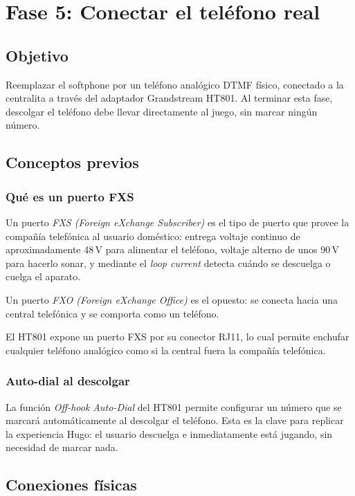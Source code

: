 \chapter{Fase 5: Conectar el teléfono real}

\section{Objetivo}

Reemplazar el softphone por un teléfono analógico DTMF físico, conectado a la centralita a través del adaptador Grandstream HT801. Al terminar esta fase, descolgar el teléfono debe llevar directamente al juego, sin marcar ningún número.

\section{Conceptos previos}

\subsection{Qué es un puerto FXS}

Un puerto \emph{FXS (Foreign eXchange Subscriber)} es el tipo de puerto que provee la compañía telefónica al usuario doméstico: entrega voltaje continuo de aproximadamente 48\,V para alimentar el teléfono, voltaje alterno de unos 90\,V para hacerlo sonar, y mediante el \emph{loop current} detecta cuándo se descuelga o cuelga el aparato.

Un puerto \emph{FXO (Foreign eXchange Office)} es el opuesto: se conecta hacia una central telefónica y se comporta como un teléfono.

El HT801 expone un puerto FXS por su conector RJ11, lo cual permite enchufar cualquier teléfono analógico como si la central fuera la compañía telefónica.

\subsection{Auto-dial al descolgar}

La función \emph{Off-hook Auto-Dial} del HT801 permite configurar un número que se marcará automáticamente al descolgar el teléfono. Esta es la clave para replicar la experiencia Hugo: el usuario descuelga e inmediatamente está jugando, sin necesidad de marcar nada.

\section{Conexiones físicas}

